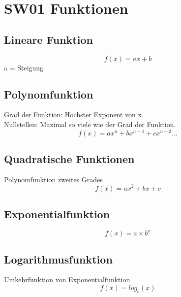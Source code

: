 \documentclass[../main.tex]{subfiles}
\begin{document}

\chapter{SW01 Funktionen}
\section{Lineare Funktion}
\[f(x)=ax+b\]
a = Steigung

\section{Polynomfunktion}
Grad der Funktion: Höchster Exponent von x. \\
Nullstellen: Maximal so viele wie der Grad der Funktion. 
\[f(x)=ax^n+bx^{n-1}+cx^{n-2}...\]

\section{Quadratische Funktionen}
Polynomfunktion zweites Grades
\[f(x)=ax^2+bx+c\]

\section{Exponentialfunktion}
\[f(x)=a \times b^x\]


\section{Logarithmusfunktion}
Umkehrfunktion von Exponentialfunktion
\[f(x)=log_b(x)\]
\end{document}
